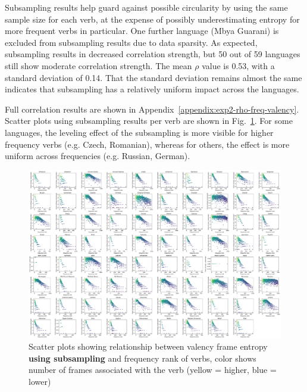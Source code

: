 Subsampling results help guard against possible circularity by using the same sample size for each verb, at the expense of possibly underestimating entropy for more frequent verbs in particular. One further language (Mbya Guarani) is excluded from subsampling results due to data sparsity. As expected, subsampling results in decreased correlation strength, but 50 out of 59 languages still show moderate correlation strength. The mean $\rho$ value is 0.53, with a standard deviation of 0.14. That the standard deviation remains almost the same indicates that subsampling has a relatively uniform impact across the languages.

Full correlation results are shown in Appendix~\ref{appendix:exp2-rho-freq-valency}. Scatter plots using subsampling results per verb are shown in Fig.~\ref{fig:joint_entropy_freq_subsample}. For some languages, the leveling effect of the subsampling is more visible for higher frequency verbs (e.g. Czech, Romanian), whereas for others, the effect is more uniform across frequencies (e.g. Russian, German).

\begin{figure}
  \centering
  \includegraphics[width=\textwidth]{figures/exp2/joint_entropy_freq_subsample.pdf}
  \caption{Scatter plots showing relationship between valency frame entropy \textbf{using subsampling} and frequency rank of verbs, color shows number of frames associated with the verb (yellow = higher, blue = lower)}
  \label{fig:joint_entropy_freq_subsample}
\end{figure}

